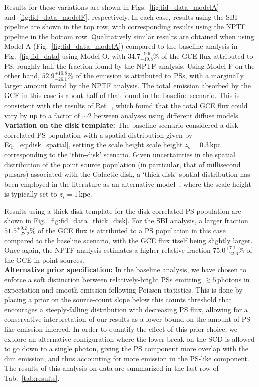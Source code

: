 \documentclass[prd,aps,10pt,nofootinbib,twocolumn,superscriptaddress,preprintnumbers,balancelastpage,longbibliography]{revtex4-1}
\begin{document}
Results for these variations are shown in Figs.~\ref{fig:fid_data_modelA} and~\ref{fig:fid_data_modelF}, respectively. In each case, results using the SBI pipeline are shown in the top row, with corresponding results using the NPTF pipeline in the bottom row. 
Qualitatively similar results are obtained when using Model A (Fig.~\ref{fig:fid_data_modelA}) compared to the baseline analysis in Fig.~\ref{fig:fid_data} using Model O, with $34.7^{+9.9}_{-19.8}\%$ of the GCE flux attributed to PS, roughly half the fraction found by the NPTF analysis. Using Model F on the other hand, $52.9^{+10.8}_{-26.1}\%$ of the emission is attributed to PSs, with a marginally larger amount found by the NPTF analysis. The total emission absorbed by the GCE in this case is about half of that found in the baseline scenario. This is consistent with the results of Ref.~\cite{Buschmann:2020adf}, which found that the total GCE flux could vary by up to a factor of $\sim 2$ between analyses using different diffuse models. \\

\noindent
\textbf{Variation on the disk template:}
The baseline scenario considered a disk-correlated PS population with a spatial distribution given by Eq.~\eqref{eq:disk_spatial}, setting the scale height scale height $z_\mathrm{s} = 0.3\,\mathrm{kpc}$ corresponding to the `thin-disk' scenario. Given uncertainties in the spatial distribution of the point source population (in particular, that of millisecond pulsars) associated with the Galactic disk, a `thick-disk' spatial distribution has been employed in the literature as an alternative model~\cite{Lee:2015fea,Leane:2019xiy,Buschmann:2020adf}, where the scale height is typically set to $z_\mathrm{s} = 1\,\mathrm{kpc}$. 

Results using a thick-disk template for the disk-correlated PS population are shown in Fig.~\ref{fig:fid_data_thick_disk}. For the SBI analysis, a larger fraction $51.5^{+9.2}_{-22.2}\%$ of the GCE flux is attributed to a PS population in this case compared to the baseline scenario, with the GCE flux itself being slightly larger. Once again, the NPTF analysis estimates a higher relative fraction $75.0^{+7.1}_{-22.6}\%$ of the GCE in point sources.\\

\noindent
\textbf{Alternative prior specification:}
In the baseline analysis, we have chosen to enforce a soft distinction between relatively-bright PSs emitting $\gtrsim 5$\,photons in expectation and smooth emission following Poisson statistics. This is done by placing a prior on the source-count slope below this counts threshold that encourages a steeply-falling distribution with decreasing PS flux, allowing for a conservative interpretation of our results as a lower bound on the amount of PS-like emission inferred. In order to quantify the effect of this prior choice, we explore an alternative configuration where the lower break on the SCD is allowed to go down to a single photon, giving the PS component more overlap with the dim emission, and thus accounting for more emission in the PS-like component. The results of this analysis on data are summarized in the last row of Tab.~\ref{tab:results}.
\end{document}
